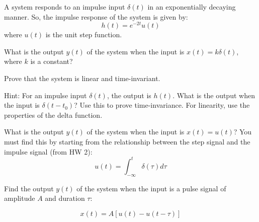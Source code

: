 \documentclass{ee102_pset}
\author{\rule{3cm}{0.4pt}} %
\begin{document}
A system responds to an impulse input $\delta(t)$ in an exponentially decaying manner. So, the impulse response of the system is given by:
\[
h(t) = e^{-2t}u(t)
\]
where $u(t)$ is the unit step function.

\problempart[5 points] What is the output $y(t)$ of the system when the input is $x(t) = k \delta(t)$, where $k$ is a constant?

\problempart[5 points] Prove that the system is linear and time-invariant. 

Hint: For an impulse input $\delta(t)$, the output is $h(t)$. What is the output when the input is $\delta(t - t_0)$? Use this to prove time-invariance. For linearity, use the properties of the delta function.

\problempart[10 points] What is the output $y(t)$ of the system when the input is $x(t) = u(t)$? You must find this by starting from the relationship between the step signal and the impulse signal (from HW 2): 
\[
u(t) = \int_{-\infty}^{t} \delta(\tau) d\tau
\]


\problempart[20 points] Find the output $y(t)$ of the system when the input is a pulse signal of amplitude $A$ and duration $\tau$:

\[
x(t) = A[u(t) - u(t-\tau)]
\]
\end{document}
